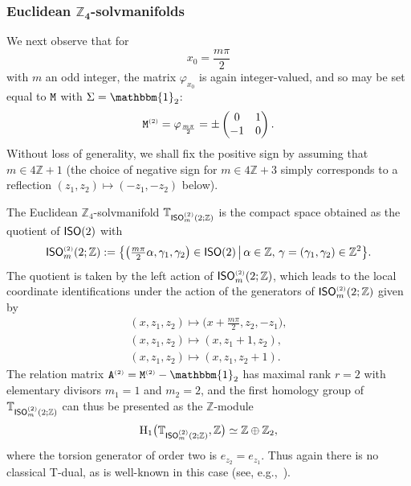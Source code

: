 \documentclass[10pt,a4paper]{amsart}
\numberwithin{equation}{section}
\newcommand{\Z}{\zed}
\newcommand{\unit}{\mathbbm{1}} 			%
\newcommand{\rmH}{{\rm H}}
\newcommand{\ISO}{{\sf ISO}}
\newcommand{\zed}{{\mathbb Z}} %
\newcommand{\torus}{{\mathbb T}} %
\begin{document}
\subsubsection*{Euclidean $\boldsymbol{\Z_4}$-solvmanifolds}

We next observe that for
\[
x_0 = \frac{m \pi}2
\]
with $m$ an odd integer, the matrix $\varphi_{x_0}$ is again integer-valued, and so
may be set equal to $\tt M$ with $\Sigma=\unit_2$:
\begin{gather}\label{eq:mon2}
{\tt M}^{\text{\tiny(2)}} = \varphi^{\phantom{\dag}}_{\frac{m \pi}2} = \pm\left( \begin{matrix}
0 & 1 \\ -1 & 0
\end{matrix} \right)  .
\end{gather}
Without loss of generality, we shall fix the positive sign by assuming that $m\in
4 \mathbb{Z}+1$ (the choice of negative sign for $m\in4 \Z+3$ simply
corresponds to a reflection $(z_1,z_2)\mapsto(-z_1,-z_2)$ below).

The Euclidean
$\Z_4$-solvmanifold $\torus_{\ISO ^{\text{\tiny(2)}}_m(2;\Z)}$ is the compact
space obtained as the quotient of $\ISO(2)$ with
\[
\ISO ^{\text{\tiny(2)}}_m(2;\Z) := \big\{ \big(\tfrac{m \pi}2 \alpha,\gamma_1,\gamma_2\big)\in\ISO(2) \,
\big| \, \alpha\in\Z , \, \gamma=(\gamma_1,\gamma_2)\in\Z^2 \big\} .
\]
The quotient is taken by the left action of
$\ISO ^{\text{\tiny(2)}}_m(2;\Z)$, which leads
to the local coordinate identifications under the action of the
generators of $\ISO ^{\text{\tiny(2)}}_m(2;\Z)$ given by
\begin{gather*}
(x,z_1,z_2)\longmapsto \big(x+\tfrac{m \pi}2,z_2,-z_1\big) , \nonumber \\
(x,z_1,z_2)\longmapsto (x,z_1+1,z_2) , \nonumber \\
(x,z_1,z_2)\longmapsto (x,z_1,z_2+1) .%
\end{gather*}
The relation matrix $
{\tt A}^{\text{\tiny(2)}} = {\tt M}^{\text{\tiny(2)}}-\unit_2 $ has maximal rank $r=2$ with elementary divisors $m_1=1$ and
$m_2=2$, and the first homology group of
$\torus_{\ISO ^{\text{\tiny(2)}}_m(2;\Z)}$ can thus be presented as the $\Z$-module
\[
\rmH_1\big(\torus_{\ISO ^{\text{\tiny(2)}}_m(2;\Z)},\Z\big) \simeq \Z\oplus\Z_2 ,
\]
where the torsion
generator of order two is $e_{z_2}=e_{z_1}$. Thus again there is no
classical T-dual, as is well-known in
this case (see, e.g.,~\cite{Hull2019}).
\end{document}
